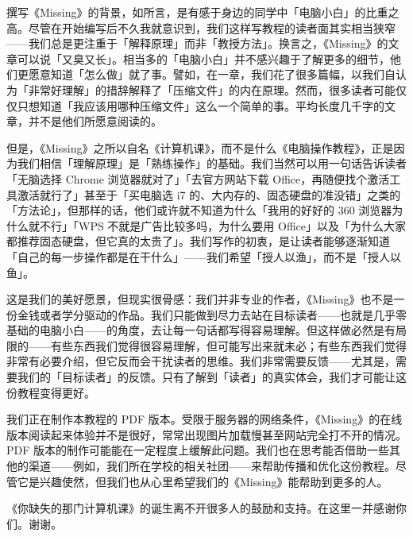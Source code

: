 撰写《Missing》的背景，如所言，是有感于身边的同学中「电脑小白」的比重之高。尽管在开始编写后不久我就意识到，我们这样写教程的读者面其实相当狭窄——我们总是更注重于「解释原理」而非「教授方法」。换言之，《Missing》的文章可以说「又臭又长」。相当多的「电脑小白」并不感兴趣于了解更多的细节，他们更愿意知道「怎么做」就了事。譬如，在一章，我们花了很多篇幅，以我们自认为「非常好理解」的措辞解释了「压缩文件」的内在原理。然而，很多读者可能仅仅只想知道「我应该用哪种压缩文件」这么一个简单的事。平均长度几千字的文章，并不是他们所愿意阅读的。

但是，《Missing》之所以自名《计算机课》，而不是什么《电脑操作教程》，正是因为我们相信「理解原理」是「熟练操作」的基础。我们当然可以用一句话告诉读者「无脑选择 Chrome 浏览器就对了」「去官方网站下载 Office，再随便找个激活工具激活就行了」甚至于「买电脑选 i7 的、大内存的、固态硬盘的准没错」之类的「方法论」，但那样的话，他们或许就不知道为什么「我用的好好的 360 浏览器为什么就不行」「WPS 不就是广告比较多吗，为什么要用 Office」以及「为什么大家都推荐固态硬盘，但它真的太贵了」。我们写作的初衷，是让读者能够逐渐知道「自己的每一步操作都是在干什么」——我们希望「授人以渔」，而不是「授人以鱼」。

这是我们的美好愿景，但现实很骨感：我们并非专业的作者，《Missing》也不是一份金钱或者学分驱动的作品。我们只能做到尽力去站在目标读者——也就是几乎零基础的电脑小白——的角度，去让每一句话都写得容易理解。但这样做必然是有局限的——有些东西我们觉得很容易理解，但可能写出来就未必；有些东西我们觉得非常有必要介绍，但它反而会干扰读者的思维。我们非常需要反馈——尤其是，需要我们的「目标读者」的反馈。只有了解到「读者」的真实体会，我们才可能让这份教程变得更好。

我们正在制作本教程的 PDF 版本。受限于服务器的网络条件，《Missing》的在线版本阅读起来体验并不是很好，常常出现图片加载慢甚至网站完全打不开的情况。PDF 版本的制作可能能在一定程度上缓解此问题。我们也在思考能否借助一些其他的渠道——例如，我们所在学校的相关社团——来帮助传播和优化这份教程。尽管它是兴趣使然，但我们也从心里希望我们的《Missing》能帮助到更多的人。

《你缺失的那门计算机课》的诞生离不开很多人的鼓励和支持。在这里一并感谢你们。谢谢。

